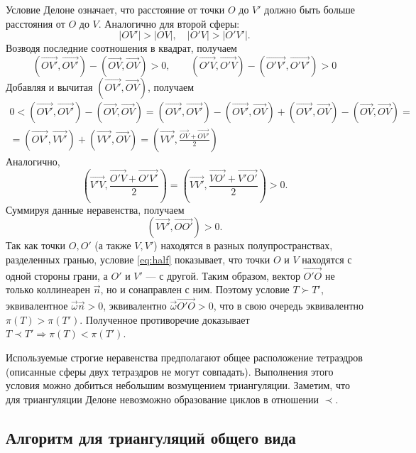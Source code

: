Условие Делоне означает, что расстояние от точки $O$ до $V'$ должно быть больше расстояния от $O$ до $V$. Аналогично для второй сферы:
\[
|OV'| > |OV|, \quad |O'V| > |O'V'|.
\]
Возводя последние соотношения в квадрат, получаем
\[
(\overrightarrow{OV'},\overrightarrow{OV'}) - (\overrightarrow{OV},\overrightarrow{OV}) > 0, \qquad
(\overrightarrow{O'V},\overrightarrow{O'V}) - (\overrightarrow{O'V'},\overrightarrow{O'V'}) > 0
\]
Добавляя и вычитая $(\overrightarrow{OV'},\overrightarrow{OV})$, получаем
\begin{multline*}
0 < (\overrightarrow{OV'},\overrightarrow{OV'}) - (\overrightarrow{OV},\overrightarrow{OV}) =
(\overrightarrow{OV'},\overrightarrow{OV'}) 
-(\overrightarrow{OV'},\overrightarrow{OV})
+(\overrightarrow{OV'},\overrightarrow{OV})
- (\overrightarrow{OV},\overrightarrow{OV}) = \\ =
(\overrightarrow{OV'},\overrightarrow{VV'}) 
+
(\overrightarrow{VV'}, \overrightarrow{OV}) = 
\left(\overrightarrow{VV'}, \frac{\overrightarrow{OV}+ \overrightarrow{OV'}}{2}\right)
\end{multline*}
Аналогично,
\[
\left(\overrightarrow{V'V}, \frac{\overrightarrow{O'V}+ \overrightarrow{O'V'}}{2}\right)  =
\left(\overrightarrow{VV'}, \frac{\overrightarrow{VO'}+ \overrightarrow{V'O'}}{2}\right) 
> 0.
\]
Суммируя данные неравенства, получаем
\begin{equation}
(\overrightarrow{VV'},\overrightarrow{OO'}) > 0.
\label{eq:half}
\end{equation}
Так как точки $O,O'$ (а также $V,V'$) находятся в разных полупространствах, разделенных гранью, условие \eqref{eq:half} показывает, что точки $O$ и $V$ находятся с одной стороны грани, а $O'$ и $V'$ --- с другой. Таким образом, вектор $\overrightarrow{O'O}$ не только коллинеарен $\vec n$, но и сонаправлен с ним. Поэтому условие $T \succ T'$, эквивалентное $\vec \omega \vec n > 0$, эквивалентно $\vec \omega \overrightarrow{O'O} > 0$, что в свою очередь эквивалентно $\pi(T) > \pi(T')$. Полученное противоречие доказывает $T \prec T' \Rightarrow \pi(T) < \pi(T')$.

Используемые строгие неравенства предполагают общее расположение тетраэдров (описанные сферы двух тетраэдров не могут совпадать). Выполнения этого условия можно добиться небольшим возмущением триангуляции. Заметим, что для триангуляции Делоне невозможно образование циклов в отношении $\prec$.


\subsection{Алгоритм для триангуляций общего вида}


